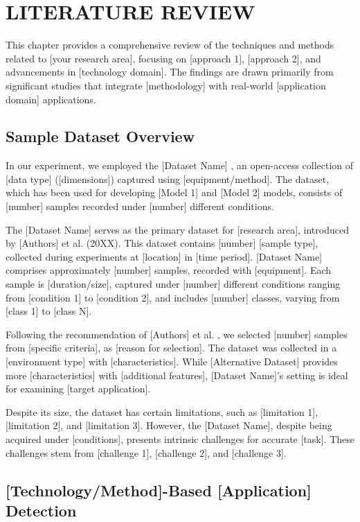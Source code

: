 \chapter{LITERATURE REVIEW}

This chapter provides a comprehensive review of the techniques and methods related to [your research area], focusing on [approach 1], [approach 2], and advancements in [technology domain]. The findings are drawn primarily from significant studies that integrate [methodology] with real-world [application domain] applications.

\section{Sample Dataset Overview}

In our experiment, we employed the [Dataset Name] \cite{sample2020reference}, an open-access collection of [data type] ([dimensions]) captured using [equipment/method]. The dataset, which has been used for developing [Model 1] \cite{sample2020reference} and [Model 2] \cite{sample2022reference} models, consists of [number] samples recorded under [number] different conditions.

The [Dataset Name] serves as the primary dataset for [research area], introduced by [Authors] et al. (20XX). This dataset contains [number] [sample type], collected during experiments at [location] in [time period]. [Dataset Name] comprises approximately [number] samples, recorded with [equipment]. Each sample is [duration/size], captured under [number] different conditions ranging from [condition 1] to [condition 2], and includes [number] classes, varying from [class 1] to [class N].

Following the recommendation of [Authors] et al. \cite{sample2022reference}, we selected [number] samples from [specific criteria], as [reason for selection]. The dataset was collected in a [environment type] with [characteristics]. While [Alternative Dataset] \cite{sample2024reference} provides more [characteristics] with [additional features], [Dataset Name]'s setting is ideal for examining [target application].

Despite its size, the dataset has certain limitations, such as [limitation 1], [limitation 2], and [limitation 3]. However, the [Dataset Name], despite being acquired under [conditions], presents intrinsic challenges for accurate [task]. These challenges stem from [challenge 1], [challenge 2], and [challenge 3].

\section{[Technology/Method]-Based [Application] Detection}

